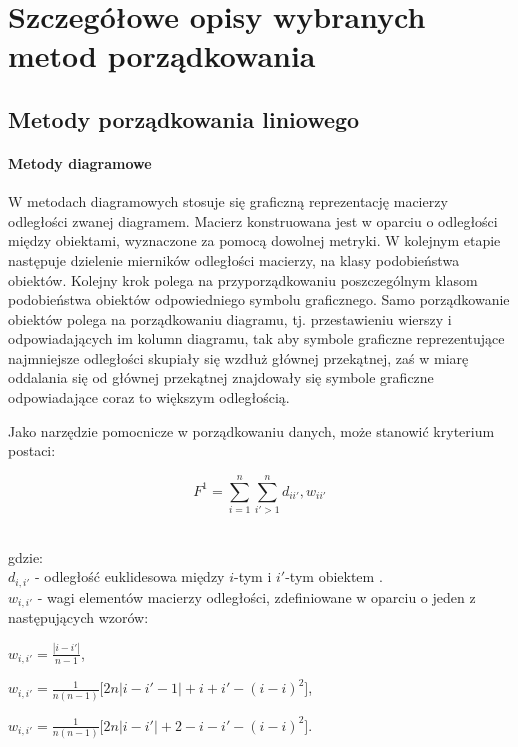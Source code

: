 \documentclass[12pt,a4paper]{report}
\begin{document}
\newpage
\chapter{Szczegółowe opisy wybranych metod porządkowania}
\section{Metody porządkowania liniowego}
\subsubsection{Metody diagramowe}
\noindent

W metodach diagramowych stosuje się graficzną reprezentację macierzy odległości zwanej diagramem. Macierz konstruowana jest w oparciu o odległości między obiektami, wyznaczone za pomocą dowolnej metryki. W kolejnym etapie następuje dzielenie mierników odległości macierzy, na klasy podobieństwa obiektów. Kolejny krok polega na przyporządkowaniu poszczególnym klasom podobieństwa obiektów odpowiedniego symbolu graficznego. Samo porządkowanie obiektów polega na porządkowaniu diagramu, tj. przestawieniu wierszy i odpowiadających im kolumn diagramu, tak aby symbole graficzne reprezentujące najmniejsze odległości skupiały się wzdłuż głównej przekątnej, zaś w miarę oddalania się od głównej przekątnej znajdowały się symbole graficzne odpowiadające coraz to większym odległością. 


Jako narzędzie pomocnicze w porządkowaniu danych, może stanowić kryterium postaci:

\begin{center}
$$F^1= \sum_{i=1}^{n} \sum_{i'>1}^{n} d_{ii'},w_{ii'}$$\\
\end{center}
gdzie:\\
 $d_{i,i'}$ - odległość euklidesowa między $i$-tym i $i'$-tym obiektem . \\
 $w_{i,i'}$ - wagi elementów macierzy odległości, zdefiniowane w oparciu o jeden z następujących wzorów: \\
 
 \begin{center}
 
 $ w_{i,i'}=\frac{| i-i' |}{n-1}$, $\qquad$ \\
   \end{center}
   \begin{center}
 $ w_{i,i'}=\frac{1}{n(n-1)}\lbrack{2n|i-i'-1|+i+i'-(i-i)^2\rbrack}$,\\
 \end{center}
 \begin{center}
 $ w_{i,i'}=\frac{1}{n(n-1)}\lbrack{2n|i-i'|+2-i-i'-(i-i)^2\rbrack}$.\\
\end{center}
\end{document}

